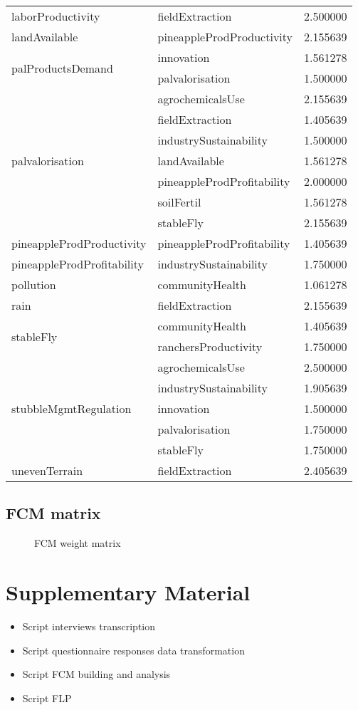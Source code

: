 \begin{tabular}{llr}
laborProductivity & fieldExtraction & 2.500000 \\
landAvailable & pineappleProdProductivity & 2.155639 \\
\multirow[c]{2}{*}{palProductsDemand} & innovation & 1.561278 \\
 & palvalorisation & 1.500000 \\
\multirow[c]{7}{*}{palvalorisation} & agrochemicalsUse & 2.155639 \\
 & fieldExtraction & 1.405639 \\
 & industrySustainability & 1.500000 \\
 & landAvailable & 1.561278 \\
 & pineappleProdProfitability & 2.000000 \\
 & soilFertil & 1.561278 \\
 & stableFly & 2.155639 \\
pineappleProdProductivity & pineappleProdProfitability & 1.405639 \\
pineappleProdProfitability & industrySustainability & 1.750000 \\
pollution & communityHealth & 1.061278 \\
rain & fieldExtraction & 2.155639 \\
\multirow[c]{2}{*}{stableFly} & communityHealth & 1.405639 \\
 & ranchersProductivity & 1.750000 \\
\multirow[c]{5}{*}{stubbleMgmtRegulation} & agrochemicalsUse & 2.500000 \\
 & industrySustainability & 1.905639 \\
 & innovation & 1.500000 \\
 & palvalorisation & 1.750000 \\
 & stableFly & 1.750000 \\
unevenTerrain & fieldExtraction & 2.405639 \\
\end{tabular}

\subsection{FCM matrix}

\begin{figure}[H]
\caption{FCM weight matrix} 
\label{FCMMatrix}
\centering
\makebox[\textwidth][c]{}%
\end{figure}

\section{Supplementary Material}
\label{suplmaterial}

\begin{itemize}
    \item Script interviews transcription
    \item Script questionnaire responses data transformation
    \item Script FCM building and analysis
    \item Script FLP 
\end{itemize}